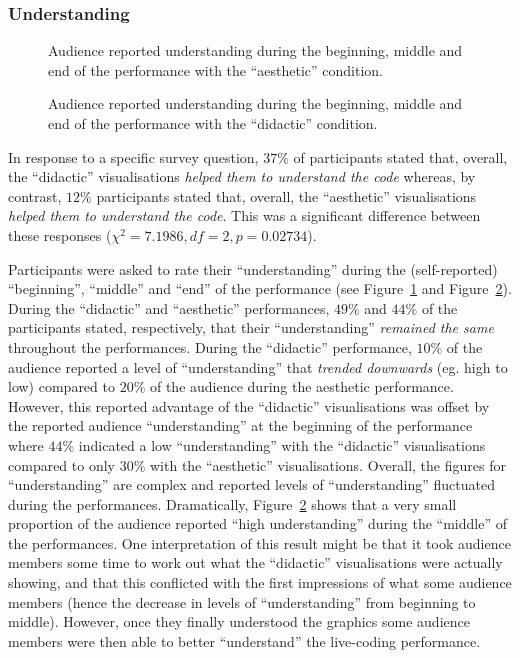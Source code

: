 \documentclass{sig-alternate}
\begin{document}
\subsubsection{Understanding}

\begin{figure}
\centering
{}
\caption{Audience reported understanding during the beginning, middle
  and end of the performance with the ``aesthetic'' condition.}
\label{fig:aesthetic-understanding}
\end{figure}

\begin{figure}
\centering
{}
\caption{Audience reported understanding during the beginning, middle
  and end of the performance with the ``didactic'' condition.}
\label{fig:didactic-understanding}
\end{figure}

In response to a specific survey question, $37\%$ of participants
stated that, overall, the ``didactic'' visualisations \emph{helped
  them to understand the code} whereas, by contrast, $12\%$
participants stated that, overall, the ``aesthetic'' visualisations
\emph{helped them to understand the code}. This was a significant
difference between these responses ($\chi^2=7.1986,df=2,p=0.02734$).

Participants were asked to rate their ``understanding'' during the
(self-reported) ``beginning'', ``middle'' and ``end'' of the
performance (see Figure~\ref{fig:aesthetic-understanding} and
Figure~\ref{fig:didactic-understanding}). During the ``didactic'' and
``aesthetic'' performances, $49\%$ and $44\%$ of the participants
stated, respectively, that their ``understanding'' \emph{remained
  the same} throughout the performances. During the ``didactic''
performance, $10\%$ of the audience reported a level of
``understanding'' that \emph{trended downwards} (eg. high to low)
compared to $20\%$ of the audience during the aesthetic performance.
However, this reported advantage of the ``didactic'' visualisations
was offset by the reported audience ``understanding'' at the beginning
of the performance where $44\%$ indicated a low ``understanding'' with
the ``didactic'' visualisations compared to only $30\%$ with the
``aesthetic'' visualisations. Overall, the figures for
``understanding'' are complex and reported levels of ``understanding''
fluctuated during the performances. Dramatically,
Figure~\ref{fig:didactic-understanding} shows that a very small
proportion of the audience reported ``high understanding'' during the
``middle'' of the performances. One interpretation of this result
might be that it took audience members some time to work out what the
``didactic'' visualisations were actually showing, and that this
conflicted with the first impressions of what some audience members
(hence the decrease in levels of ``understanding'' from beginning to
middle). However, once they finally understood the graphics some
audience members were then able to better ``understand'' the
live-coding performance.
\end{document}
